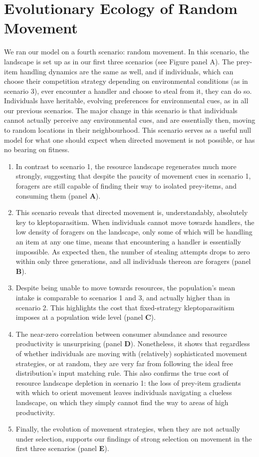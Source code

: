 {\section*{Evolutionary Ecology of Random Movement}

We ran our model on a fourth scenario: random movement.
In this scenario, the landscape is set up as in our first three scenarios (see Figure panel A).
The prey-item handling dynamics are the same as well, and if individuals, which can choose their competition strategy depending on environmental conditions (as in scenario 3), ever encounter a handler and choose to steal from it, they can do so.
Individuals have heritable, evolving preferences for environmental cues, as in all our previous scenarios.
The major change in this scenario is that individuals cannot actually perceive any environmental cues, and are essentially then, moving to random locations in their neighbourhood.
This scenario serves as a useful null model for what one should expect when directed movement is not possible, or has no bearing on fitness.

\begin{enumerate}
    \item
    In contrast to scenario 1, the resource landscape regenerates much more strongly, suggesting that despite the paucity of movement cues in scenario 1, foragers are still capable of finding their way to isolated prey-items, and consuming them (panel \textbf{A}).
    \item
    This scenario reveals that directed movement is, understandably, absolutely key to kleptoparasitism.
    When individuals cannot move towards handlers, the low density of foragers on the landscape, only some of which will be handling an item at any one time, means that encountering a handler is essentially impossible.
    As expected then, the number of stealing attempts drops to zero within only three generations, and all individuals thereon are foragers (panel \textbf{B}).
    \item
    Despite being unable to move towards resources, the population's mean intake is comparable to scenarios 1 and 3, and actually higher than in scenario 2.
    This highlights the cost that fixed-strategy kleptoparasitism imposes at a population wide level (panel \textbf{C}).
    \item
    The near-zero correlation between consumer abundance and resource productivity is unsurprising (panel \textbf{D}).
    Nonetheless, it shows that regardless of whether individuals are moving with (relatively) sophisticated movement strategies, or at random, they are very far from following the ideal free distribution's input matching rule.
    This also confirms the true cost of resource landscape depletion in scenario 1: the loss of prey-item gradients with which to orient movement leaves individuals navigating a clueless landscape, on which they simply cannot find the way to areas of high productivity.
    \item
    Finally, the evolution of movement strategies, when they are not actually under selection, supports our findings of strong selection on movement in the first three scenarios (panel \textbf{E}).
\end{enumerate}

}
